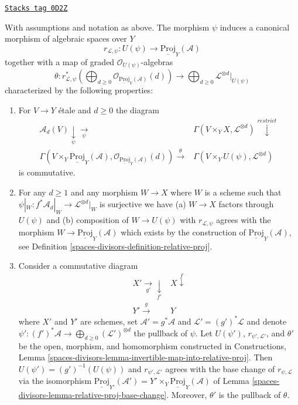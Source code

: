 \begin{lemma}
\label{spaces-divisors-lemma-invertible-map-into-relative-proj}
\href{https://stacks.math.columbia.edu/tag/0D2Z}{\texttt{Stacks tag 0D2Z}}

With assumptions and notation as above. The morphism
$\psi$ induces a canonical morphism of algebraic spaces over $Y$
$$
r_{\mathcal{L}, \psi} :
U(\psi) \longrightarrow \underline{\text{Proj}}_Y(\mathcal{A})
$$
together with a map of graded $\mathcal{O}_{U(\psi)}$-algebras
$$
\theta :
r_{\mathcal{L}, \psi}^*\left(
\bigoplus\nolimits_{d \geq 0}
\mathcal{O}_{\underline{\text{Proj}}_Y(\mathcal{A})}(d)
\right)
\longrightarrow
\bigoplus\nolimits_{d \geq 0} \mathcal{L}^{\otimes d}|_{U(\psi)}
$$
characterized by the following properties:
\begin{enumerate}
\item For $V \to Y$ \'etale and $d \geq 0$ the diagram
$$
\begin{array}{cc}\mathcal{A}_d(V) \underset{\psi}{\downarrow}\underset{\psi}{\longrightarrow} & \Gamma(V \times_Y X, \mathcal{L}^{\otimes d}) \overset{restrict}{\downarrow} \\ \Gamma(V \times_Y \underline{\text{Proj}}_Y(\mathcal{A}),
\mathcal{O}_{\underline{\text{Proj}}_Y(\mathcal{A})}(d)) \overset{\theta}{\longrightarrow} & \Gamma(V \times_Y U(\psi), \mathcal{L}^{\otimes d})\end{array}
$$
is commutative.
\item For any $d \geq 1$ and any morphism $W \to X$ where $W$ is a scheme
such that $\psi|_W : f^*\mathcal{A}_d|_W \to \mathcal{L}^{\otimes d}|_W$
is surjective we have (a) $W \to X$ factors through $U(\psi)$ and
(b) composition of $W \to U(\psi)$ with $r_{\mathcal{L}, \psi}$
agrees with the morphism $W \to \underline{\text{Proj}}_Y(\mathcal{A})$
which exists by the construction of $\underline{\text{Proj}}_Y(\mathcal{A})$,
see Definition \ref{spaces-divisors-definition-relative-proj}.
\item Consider a commutative diagram
$$
\begin{array}{cc}X' \underset{g'}{\longrightarrow}\underset{f'}{\downarrow} & X \overset{f}{\downarrow} \\ Y' \overset{g}{\longrightarrow} & Y\end{array}
$$
where $X'$ and $Y'$ are schemes, set $\mathcal{A}' = g^*\mathcal{A}$
and $\mathcal{L}' = (g')^*\mathcal{L}$ and denote
$\psi' : (f')^*\mathcal{A} \to \bigoplus_{d \geq 0} (\mathcal{L}')^{\otimes d}$
the pullback of $\psi$. Let $U(\psi')$, $r_{\psi', \mathcal{L}'}$,
and $\theta'$ be the open, morphism, and homomorphism constructed
in Constructions, Lemma \ref{spaces-divisors-lemma-invertible-map-into-relative-proj}.
Then $U(\psi') = (g')^{-1}(U(\psi))$
and $r_{\psi', \mathcal{L}'}$ agrees with the base change
of $r_{\psi, \mathcal{L}}$ via the isomorphism
$\underline{\text{Proj}}_{Y'}(\mathcal{A}') =
Y' \times_Y \underline{\text{Proj}}_Y(\mathcal{A})$
of Lemma \ref{spaces-divisors-lemma-relative-proj-base-change}.
Moreover, $\theta'$ is the pullback of $\theta$.
\end{enumerate}
\end{lemma}

